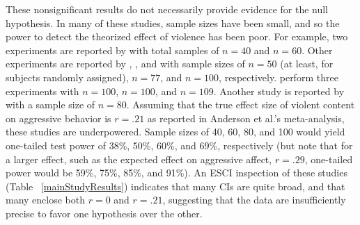 \documentclass[man]{apa6}
\begin{document}
These nonsignificant results do not necessarily provide evidence for the null hypothesis. In many of these studies, sample sizes have been small, and so the power to detect the theorized effect of violence has been poor.  For example, two experiments are reported by \citet{Adachi:Willoughby:2011} with total samples of $n = 40$ and $n = 60$. Other experiments are reported by \citet{Ferguson:etal:2008}, \citet{Ferguson:Rueda:2010}, and \citet{Valadez:Ferguson:2012} with sample sizes of $n = 50$ (at least, for subjects randomly assigned), $n = 77$, and $n = 100$, respectively. \citet[(Studies 1, 2, and 5)]{Przybylski:etal:2014} %
perform three experiments with $n = 100$, $n = 100$, and $n = 109$. Another study is reported by \citet{Elson:etal:2014} with a sample size of $ n = 80 $. Assuming that the true effect size of violent content on aggressive behavior is $ r = .21 $ as reported in Anderson et al.'s meta-analysis, these studies are underpowered. Sample sizes of 40, 60, 80, and 100 would yield one-tailed test power of 38\%, 50\%, 60\%, and 69\%, respectively (but note that for a larger effect, such as the expected effect on aggressive affect, $r = .29$, one-tailed power would be 59\%, 75\%, 85\%, and 91\%). An ESCI inspection of these studies (Table ~\ref{mainStudyResults}) indicates that many CIs are quite broad, and that many enclose both $ r = 0 $ and $ r = .21 $, suggesting that the data are insufficiently precise to favor one hypothesis over the other. 

\end{document}
